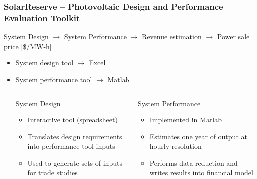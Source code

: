 \documentclass[aspectratio=169]{beamer}
\begin{document}
\begin{frame}
  \frametitle{SolarReserve -- Photovoltaic Design and Performance
    Evaluation Toolkit} System Design $\rightarrow$ System Performance
  $\rightarrow$ Revenue estimation $\rightarrow$ Power sale price
             [\$/MW-h]
  \begin{itemize}
  \item System design tool $\rightarrow$ Excel
  \item System performance tool $\rightarrow$ Matlab
    
    \begin{columns}[t]
      \begin{block}{System Design}
        \begin{itemize}
          \item Interactive tool (spreadsheet)
          \item Translates design requirements into performance tool inputs
          \item Used to generate sets of inputs for trade studies
        \end{itemize}
        
      \end{block}
      \begin{block}{System Performance}
        \begin{itemize}
          \item Implemented in Matlab
          \item Estimates one year of output at hourly resolution
          \item Performs data reduction and writes results into financial model
        \end{itemize}
      \end{block}
    \end{columns}
  \end{itemize}
\end{frame}
\end{document}
